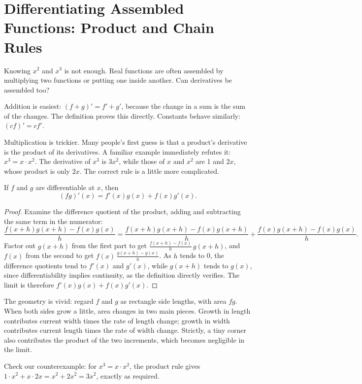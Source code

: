 \section{Differentiating Assembled Functions: Product and Chain Rules}

Knowing $x^2$ and $x^3$ is not enough. Real functions are often assembled by multiplying two functions or putting one inside another. Can derivatives be assembled too?

Addition is easiest: $(f+g)'=f'+g'$, because the change in a sum is the sum of the changes. The definition proves this directly. Constants behave similarly: $(cf)'=cf'$.

Multiplication is trickier. Many people's first guess is that a product's derivative is the product of its derivatives. A familiar example immediately refutes it: $x^3=x\cdot x^2$. The derivative of $x^3$ is $3x^2$, while those of $x$ and $x^2$ are 1 and $2x$, whose product is only $2x$. The correct rule is a little more complicated.

\begin{dingli}
If $f$ and $g$ are differentiable at $x$, then
\[
(fg)'(x)=f'(x)g(x)+f(x)g'(x).
\]
\end{dingli}

\begin{proof}
Examine the difference quotient of the product, adding and subtracting the same term in the numerator:
\[
\frac{f(x+h)g(x+h)-f(x)g(x)}{h}
=\frac{f(x+h)g(x+h)-f(x)g(x+h)}{h}
+\frac{f(x)g(x+h)-f(x)g(x)}{h}.
\]
Factor out $g(x+h)$ from the first part to get $\frac{f(x+h)-f(x)}{h}\,g(x+h)$, and $f(x)$ from the second to get $f(x)\,\frac{g(x+h)-g(x)}{h}$. As $h$ tends to 0, the difference quotients tend to $f'(x)$ and $g'(x)$, while $g(x+h)$ tends to $g(x)$, since differentiability implies continuity, as the definition directly verifies. The limit is therefore $f'(x)g(x)+f(x)g'(x)$.
\end{proof}

The geometry is vivid: regard $f$ and $g$ as rectangle side lengths, with area $fg$. When both sides grow a little, area changes in two main pieces. Growth in length contributes current width times the rate of length change; growth in width contributes current length times the rate of width change. Strictly, a tiny corner also contributes the product of the two increments, which becomes negligible in the limit.

Check our counterexample: for $x^3=x\cdot x^2$, the product rule gives $1\cdot x^2+x\cdot 2x=x^2+2x^2=3x^2$, exactly as required.

